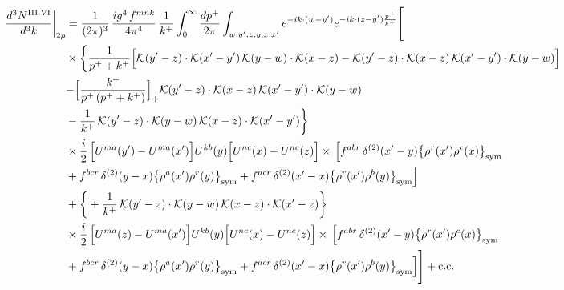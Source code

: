 \documentclass[9pt]{article}
\numberwithin{equation}{section}
\begin{document}
\begin{align}
\frac{d^{3}N^{\rm III.VI}}{d^{3}k}\bigg|_{2\rho}&=\frac{1}{(2\pi)^{3}}\,\frac{ig^{4}\,f^{mnk}}{4\pi^{4}}\,\frac{1}{k^{+}}\int_{0}^{\infty}\frac{dp^{+}}{2\pi}\int_{w,y',z,y,x,x'}e^{-ik\cdot{(w-y')}}e^{-ik\cdot{(z-y')}\frac{p^{+}}{k^{+}}}\Bigg[\notag\\
&\times\bigg\{\frac{1}{p^{+}+k^{+}}\Big[\mathcal{K}(y'-z)\cdot\mathcal{K}(x'-y')\,\mathcal{K}(y-w)\cdot\mathcal{K}(x-z)-\mathcal{K}(y'-z)\cdot\mathcal{K}(x-z)\,\mathcal{K}(x'-y')\cdot\mathcal{K}(y-w)\Big]\notag\\
&{-\Big[\frac{k^{+}}{p^{+}\,(p^{+}+k^{+})}\Big]_{+}\mathcal{K}(y'-z)\cdot\mathcal{K}(x-z)\,\mathcal{K}(x'-y')\cdot\mathcal{K}(y-w)}\notag\\
&-\frac{1}{k^{+}}\,\mathcal{K}(y'-z)\cdot\mathcal{K}(y-w)\,\mathcal{K}(x-z)\cdot\mathcal{K}(x'-y')\bigg\}\notag\\
&\times \frac{i}{2}\,\Big[U^{ma}(y')-U^{ma}(x')\Big]U^{kb}(y)\Big[U^{nc}(x)-U^{nc}(z)\Big]\times\,\Big[f^{abr}\,\delta^{(2)}(x'-y)\big\{\rho^{r}(x')\rho^{c}(x)\big\}_{\rm sym}\notag\\
& +f^{bcr}\,\delta^{(2)}(y-x)\big\{\rho^{a}(x')\rho^{r}(y)\big\}_{\rm sym} +f^{acr}\,\delta^{(2)}(x'-x)\big\{\rho^{r}(x')\rho^{b}(y)\big\}_{\rm sym}\Big]\notag\\
&+\bigg\{+\frac{1}{k^{+}}\,\mathcal{K}(y'-z)\cdot\mathcal{K}(y-w)\,\mathcal{K}(x-z)\cdot\mathcal{K}(x'-z)\bigg\}\notag\\
&\times \frac{i}{2}\,\Big[U^{ma}(z)-U^{ma}(x')\Big]U^{kb}(y)\Big[U^{nc}(x)-U^{nc}(z)\Big]\times\,\Big[f^{abr}\,\delta^{(2)}(x'-y)\big\{\rho^{r}(x')\rho^{c}(x)\big\}_{\rm sym}\notag\\
& +f^{bcr}\,\delta^{(2)}(y-x)\big\{\rho^{a}(x')\rho^{r}(y)\big\}_{\rm sym} +f^{acr}\,\delta^{(2)}(x'-x)\big\{\rho^{r}(x')\rho^{b}(y)\big\}_{\rm sym}\Big]\Bigg]+{\rm c.c.}\label{eq:D-III.VI-2}
\end{align}
\end{document}
